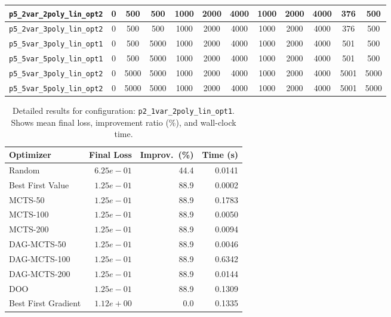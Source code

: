 \begin{landscape}
\begin{table}[H]
{\begin{tabular}{lccccccccccc}
\hline
\texttt{p5\_2var\_2poly\_lin\_opt2} & 0 & 500 & 500 & 1000 & 2000 & 4000 & 1000 & 2000 & 4000 & 376 & 500 \\
\hline
\texttt{p5\_2var\_3poly\_lin\_opt2} & 0 & 500 & 500 & 1000 & 2000 & 4000 & 1000 & 2000 & 4000 & 376 & 500 \\
\hline
\texttt{p5\_5var\_3poly\_lin\_opt1} & 0 & 500 & 5000 & 1000 & 2000 & 4000 & 1000 & 2000 & 4000 & 501 & 500 \\
\hline
\texttt{p5\_5var\_5poly\_lin\_opt1} & 0 & 500 & 5000 & 1000 & 2000 & 4000 & 1000 & 2000 & 4000 & 501 & 500 \\
\hline
\texttt{p5\_5var\_3poly\_lin\_opt2} & 0 & 5000 & 5000 & 1000 & 2000 & 4000 & 1000 & 2000 & 4000 & 5001 & 5000 \\
\hline
\texttt{p5\_5var\_5poly\_lin\_opt2} & 0 & 5000 & 5000 & 1000 & 2000 & 4000 & 1000 & 2000 & 4000 & 5001 & 5000 \\
\bottomrule
\end{tabular}
}%
\end{table}
\end{landscape}


\begin{table}[H]
\centering
\caption{Detailed results for configuration: \texttt{p2\_1var\_2poly\_lin\_opt1}. Shows mean final loss, improvement ratio (\%), and wall-clock time.}
\label{tab:abssum-detail-1}
\begin{tabular}{lrrr}
\toprule
Optimizer & Final Loss & Improv.~(\%) & Time (s) \\
\midrule
Random & $6.25e-01$ & 44.4 & 0.0141 \\
\hline
Best First Value & \textbf{$1.25e-01$} & 88.9 & 0.0002 \\
\hline
MCTS-50 & \textbf{$1.25e-01$} & 88.9 & 0.1783 \\
\hline
MCTS-100 & \textbf{$1.25e-01$} & 88.9 & 0.0050 \\
\hline
MCTS-200 & \textbf{$1.25e-01$} & 88.9 & 0.0094 \\
\hline
DAG-MCTS-50 & \textbf{$1.25e-01$} & 88.9 & 0.0046 \\
\hline
DAG-MCTS-100 & \textbf{$1.25e-01$} & 88.9 & 0.6342 \\
\hline
DAG-MCTS-200 & \textbf{$1.25e-01$} & 88.9 & 0.0144 \\
\hline
DOO & $1.25e-01$ & 88.9 & 0.1309 \\
\hline
Best First Gradient & $1.12e+00$ & 0.0 & 0.1335 \\
\bottomrule
\end{tabular}
\end{table}

